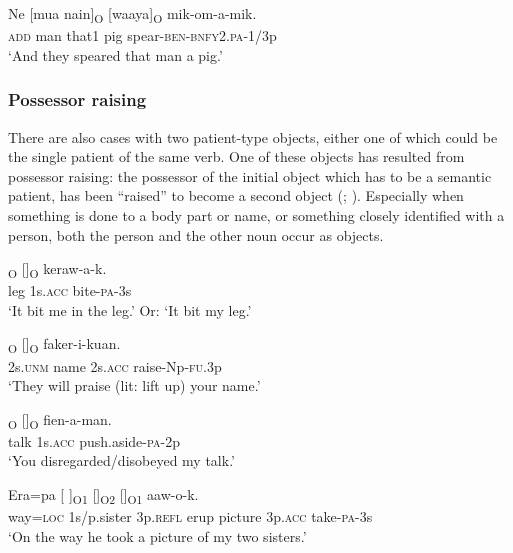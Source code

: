 \ea%
\label{ex:5:x1840}
\gll Ne  [mua  nain]\textsubscript{O}  [waaya]\textsubscript{O}  mik-om-a-mik. \\
     \textsc{add}  man  that1  pig  spear-\textsc{ben}-\textsc{bnfy}2.\textsc{pa}-1/3p \\
\glt `And they speared that man a pig.'
\z

\subsubsection[Possessor raising]{Possessor raising} \label{sec:5.3.2.3}

There are also cases with two patient-type objects, either one of which could be the single patient of the same verb. One of these objects has resulted from possessor raising: the possessor of the initial object  which has to be a semantic patient, has been ``raised'' to become a second object (\citealt[258]{VanValinEtAl1997}; \citealt[194--196]{Payne1997}). Especially when something is done to a body part or name, or something closely identified with a person, both the person and the other noun occur as objects.

\ea%
\label{ex:5:x951}
\textsubscript{O} []\textsubscript{O}  keraw-a-k. \\
     leg  1s.\textsc{acc}  bite-\textsc{pa}-3s \\
\glt `It bit me in the leg.' Or: `It bit my leg.'
\z

\ea%
\label{ex:5:x952}
\textsubscript{O}  []\textsubscript{O}  faker-i-kuan. \\
     2s.\textsc{unm}  name  2s.\textsc{acc}  raise-Np-\textsc{fu}.3p \\
\glt `They will praise (lit: lift up) your name.'
\z

\ea%
\label{ex:5:x957}
\textsubscript{O}  []\textsubscript{O}  fien-a-man. \\
     talk  1s.\textsc{acc}  push.aside-\textsc{pa}-2p \\
\glt `You disregarded/disobeyed my talk.'
\z

\ea%
\label{ex:5:x948}
\gll Era=pa  [  ]\textsubscript{O1}  []\textsubscript{O2}  []\textsubscript{O1} aaw-o-k. \\
     way=\textsc{loc}  1s/p.sister  3p.\textsc{refl}  erup  picture  3p.\textsc{acc} take-\textsc{pa}-3s \\
\glt `On the way he took a picture of my two sisters.'
\z

